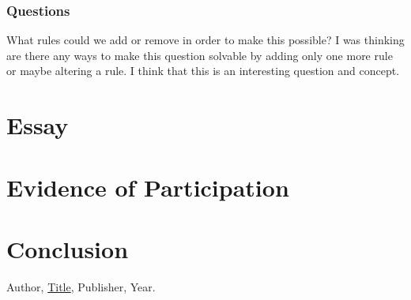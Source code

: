 \documentclass{article}
\theoremstyle{theorem}
\theoremstyle{definition}
\theoremstyle{remark}
\begin{document}
\subsubsection{Questions}

What rules could we add or remove in order to make this possible? I was thinking are there any ways to make this question solvable
by adding only one more rule or maybe altering a rule. I think that this is an interesting question and concept.

\section{Essay}

\section{Evidence of Participation}

\section{Conclusion}\label{conclusion}

\begin{thebibliography}{99}
 Author, \href{https://en.wikipedia.org/wiki/LaTeX}{Title}, Publisher, Year.
\end{thebibliography}
\end{document}
